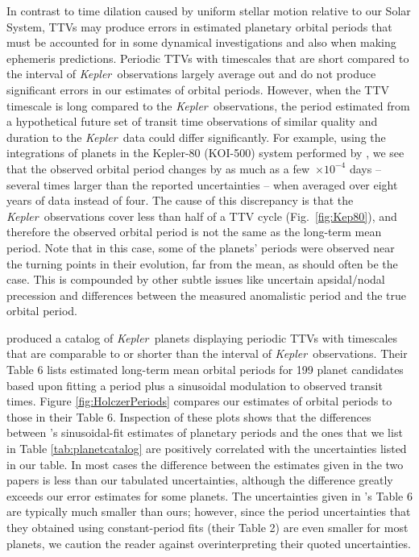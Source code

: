 \documentclass{aastex62}
\newcommand{\ik}{{\it Kepler~}}
\begin{document}
In contrast to time dilation caused by uniform stellar motion relative to our Solar System,  TTVs may produce errors in estimated planetary orbital periods that must be accounted for in some dynamical investigations and also when making ephemeris predictions. %
Periodic TTVs with timescales that are short compared to the interval of \ik observations largely average out and do not produce significant errors in our estimates of orbital periods.  However, when the TTV timescale is long compared to the \ik observations, the period estimated from a hypothetical future set of transit time observations of similar quality and duration to the \ik data could differ significantly.  For example, using the integrations of planets in the Kepler-80 (KOI-500) system performed by \citet{MacDonald:2016}, we see that the observed orbital period changes by as much as a few~$\times 10^{-4}$ days -- several times larger than the reported uncertainties -- when averaged over eight years of data instead of four. The cause of this discrepancy is that the \ik observations cover less than half of a TTV cycle (Fig.~\ref{fig:Kep80}), and therefore the observed orbital period is not the same as the long-term mean period. Note that in this case, some of the planets' periods were  observed near the turning points in their evolution, far from the mean, as should often be the case.  This is compounded by other subtle issues like uncertain apsidal/nodal precession and differences between the measured anomalistic period and the true orbital period. 

\cite{Holczer:2016} produced a catalog of \ik planets displaying periodic TTVs with timescales that are comparable to or shorter than the interval of \ik observations.  Their Table 6 lists estimated long-term mean orbital periods for 199 planet candidates based upon fitting a period plus a sinusoidal modulation to observed transit times.  
Figure \ref{fig:HolczerPeriods} compares our estimates of orbital periods to those in their Table 6. Inspection of these plots shows that the differences between \citet{Holczer:2016}'s sinusoidal-fit estimates of planetary periods and the ones that we list in Table \ref{tab:planetcatalog} are positively correlated with the uncertainties listed in our table.  In most cases the difference between the estimates given in the two papers is less than our tabulated uncertainties, although the difference greatly exceeds our error estimates for some planets. The uncertainties given in \citet{Holczer:2016}'s Table 6 are typically much smaller than ours; however, since the period uncertainties that they obtained using constant-period fits (their Table 2) are even smaller for most planets, we caution the reader against overinterpreting their quoted uncertainties.  
\end{document}
